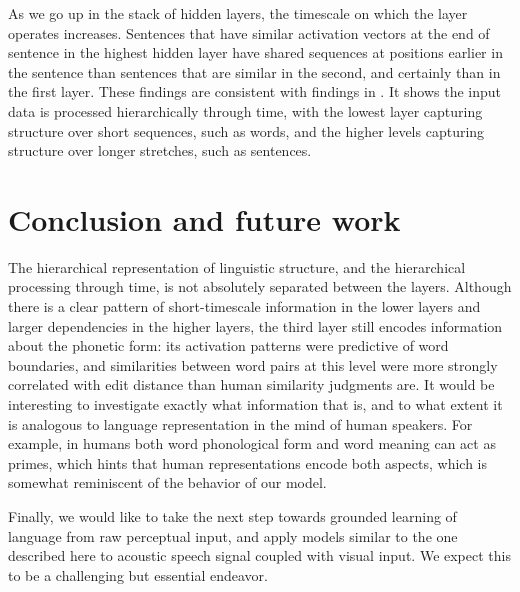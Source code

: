 As we go up in the stack of hidden layers, the timescale on which the layer operates increases. Sentences that have similar activation vectors at the end of sentence in the highest hidden layer have shared sequences at positions earlier in the sentence than sentences that are similar in the second, and certainly than in the first layer. These findings are consistent with findings in . It shows the input data is processed hierarchically through time, with the lowest layer capturing structure over short sequences, such as words, and the higher levels capturing structure over longer stretches, such as sentences. 

\section{Conclusion and future work}
The hierarchical representation of linguistic structure, and the hierarchical processing through time, is not absolutely separated between the layers. Although there is a clear pattern of short-timescale information in the lower layers and larger dependencies in the higher layers, the third layer still encodes information about the phonetic form: its activation patterns were predictive of word boundaries, and similarities between word pairs at this level were more strongly correlated with edit distance than human similarity judgments are. It would be interesting to investigate exactly what information that is, and to what extent it is analogous to language representation in the mind of human speakers. For example, in humans both word phonological form and word meaning can act as primes, which hints that human representations encode both aspects, which is somewhat reminiscent of the behavior of  our model.

Finally, we would like to take the next step towards grounded learning of language from raw perceptual input, and apply models similar to the one described here to acoustic speech signal coupled with visual input. We expect this to be a challenging but essential endeavor.

